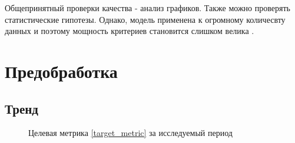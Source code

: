 \documentclass[14pt, a4paper]{extarticle}
\begin{document}
	Общепринятный проверки качества - анализ графиков.
	Также можно проверять статистические гипотезы.
	Однако, модель применена к огромному количесвту данных и поэтому мощность критериев становится слишком велика \cite{lib_large_samples}.
	
	
	\section{Предобработка}
	\subsection{Тренд}
	
	\begin{figure}[h]
		\centerline{} 
		\caption{Целевая метрика \ref{target_metric} за исследуемый период}
		\label{target_metric_fig1}
	\end{figure} 
	
\end{document}
